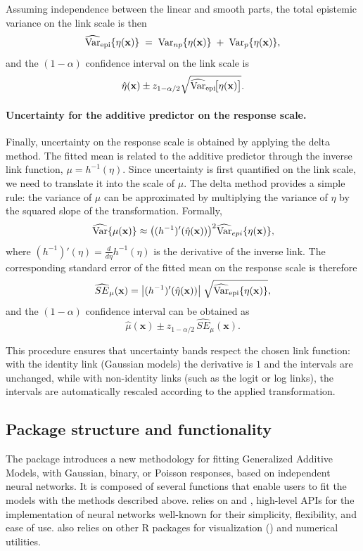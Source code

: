 Assuming independence between the linear and smooth parts, the total epistemic variance on the link scale is then
\[
\widehat{\mathrm{Var}}_{\text{epi}}\{\eta(\mathbf{x})\}
\;=\; \mathrm{Var}_{np}\{\eta(\mathbf{x})\} \;+\; \mathrm{Var}_p\{\eta(\mathbf{x})\},
\]
and the $(1-\alpha)$ confidence interval on the link scale is 
\[
\hat\eta(\mathbf{x}) \pm z_{1-\alpha/2} \sqrt{\widehat{\mathrm{Var}}_{\mathrm{epi}}\!\bigl[\eta(\mathbf{x})\bigr]}.
\]

\paragraph{Uncertainty for the additive predictor on the response scale.}

Finally, uncertainty on the response scale is obtained by applying the delta method. The fitted mean is related to the additive predictor through the inverse link function, $\mu = h^{-1}(\eta)$. Since uncertainty is first quantified on the link scale, we need to translate it into the scale of $\mu$. The delta method provides a simple rule: the variance of $\mu$ can be approximated by multiplying the variance of $\eta$ by the squared slope of the transformation. Formally,
\[
\widehat{\mathrm{Var}} \{\mu(\mathbf{x}) \} \approx \bigl((h^{-1})'(\hat\eta(\mathbf{x}))\bigr)^2 \widehat{\mathrm{Var}}_{epi}\{\eta(\mathbf{x})\},
\]
where $(h^{-1})'(\eta) = \tfrac{d}{d\eta}h^{-1}(\eta)$ is the derivative of the inverse link. The corresponding standard error of the fitted mean on the response scale is therefore
\[
\widehat{SE}_\mu(\mathbf{x})
= \bigl|(h^{-1})'(\hat\eta(\mathbf{x}))\bigr|\;
\sqrt{\widehat{\mathrm{Var}}_{\text{epi}}\{\eta(\mathbf{x})\}},
\]
and the $(1-\alpha)$ confidence interval can be obtained as
\[
\hat\mu (\mathbf{x}) \pm z_{1-\alpha/2}\,\widehat{SE}_\mu(\mathbf{x}).
\]

This procedure ensures that uncertainty bands respect the chosen link function: with the identity link (Gaussian models) the derivative is $1$ and the intervals are unchanged, while with non-identity links (such as the logit or log links), the intervals are automatically rescaled according to the applied transformation.

\subsection{Package structure and functionality}
\label{package_struc}

The  package introduces a new methodology for fitting Generalized Additive Models, with Gaussian, binary, or Poisson responses, based on independent neural networks. It is composed of several functions that enable users to fit the models with the methods described above.  relies on  \citep{chollet2015keras} and  \citep{tensorflow2015-whitepaper}, high-level APIs for the implementation of neural networks well-known for their simplicity, flexibility, and ease of use.  also relies on other \textsf{R} packages for visualization () and numerical utilities.

